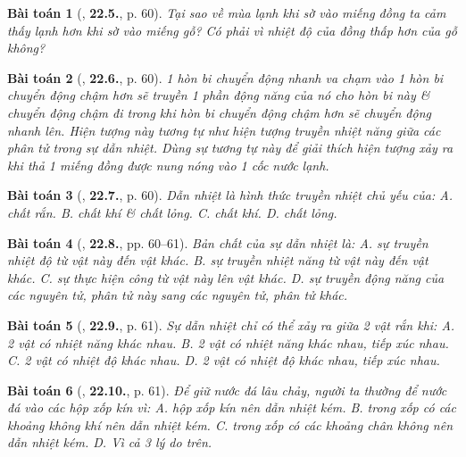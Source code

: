 \documentclass{article}
\numberwithin{equation}{section}
\newtheorem{baitoan}{Bài toán}
\begin{document}
\begin{baitoan}[\cite{SBT_Vat_Ly_8}, \textbf{22.5.}, p. 60]
	Tại sao về mùa lạnh khi sờ vào miếng đồng ta cảm thấy lạnh hơn khi sờ vào miếng gỗ? Có phải vì nhiệt độ của đồng thấp hơn của gỗ không?
\end{baitoan}

\begin{baitoan}[\cite{SBT_Vat_Ly_8}, \textbf{22.6.}, p. 60]
	1 hòn bi chuyển động nhanh va chạm vào 1 hòn bi chuyển động chậm hơn sẽ truyền 1 phần động năng của nó cho hòn bi này \& chuyển động chậm đi trong khi hòn bi chuyển động chậm hơn sẽ chuyển động nhanh lên. Hiện tượng này tương tự như hiện tượng truyền nhiệt năng giữa các phân tử trong sự dẫn nhiệt. Dùng sự tương tự này để giải thích hiện tượng xảy ra khi thả 1 miếng đồng được nung nóng vào 1 cốc nước lạnh.
\end{baitoan}

\begin{baitoan}[\cite{SBT_Vat_Ly_8}, \textbf{22.7.}, p. 60]
	Dẫn nhiệt là hình thức truyền nhiệt chủ yếu của: {\sf A.} chất rắn. {\sf B.} chất khí \& chất lỏng. {\sf C.} chất khí. {\sf D.} chất lỏng.
\end{baitoan}

\begin{baitoan}[\cite{SBT_Vat_Ly_8}, \textbf{22.8.}, pp. 60--61]
	Bản chất của sự dẫn nhiệt là: {\sf A.} sự truyền nhiệt độ từ vật này đến vật khác. {\sf B.} sự truyền nhiệt năng từ vật này đến vật khác. {\sf C.} sự thực hiện công từ vật này lên vật khác. {\sf D.} sự truyền động năng của các nguyên tử, phân tử này sang các nguyên tử, phân tử khác.
\end{baitoan}

\begin{baitoan}[\cite{SBT_Vat_Ly_8}, \textbf{22.9.}, p. 61]
	Sự dẫn nhiệt chỉ có thể xảy ra giữa 2 vật rắn khi: {\sf A.} 2 vật có nhiệt năng khác nhau. {\sf B.} 2 vật có nhiệt năng khác nhau, tiếp xúc nhau. {\sf C.} 2 vật có nhiệt độ khác nhau. {\sf D.} 2 vật có nhiệt độ khác nhau, tiếp xúc nhau.
\end{baitoan}

\begin{baitoan}[\cite{SBT_Vat_Ly_8}, \textbf{22.10.}, p. 61]
	Để giữ nước đá lâu chảy, người ta thường để nước đá vào các hộp xốp kín vì: {\sf A.} hộp xốp kín nên dẫn nhiệt kém. {\sf B.} trong xốp có các khoảng không khí nên dẫn nhiệt kém. {\sf C.} trong xốp có các khoảng chân không nên dẫn nhiệt kém. {\sf D.} Vì cả 3 lý do trên.
\end{baitoan}
\end{document}
